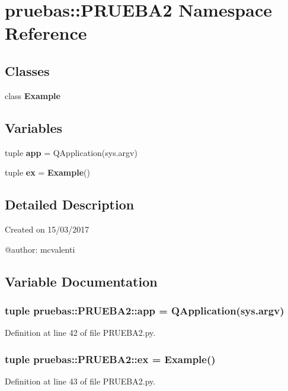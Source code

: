 \section{pruebas\-:\-:\-P\-R\-U\-E\-B\-A2 \-Namespace \-Reference}
\label{namespacepruebas_1_1_p_r_u_e_b_a2}
\subsection*{\-Classes}
\begin{DoxyCompactItemize}
\item 
class {\bf \-Example}
\end{DoxyCompactItemize}
\subsection*{\-Variables}
\begin{DoxyCompactItemize}
\item 
tuple {\bf app} = \-Q\-Application(sys.\-argv)
\item 
tuple {\bf ex} = {\bf \-Example}()
\end{DoxyCompactItemize}


\subsection{\-Detailed \-Description}
\begin{DoxyVerb}
Created on 15/03/2017

@author: mcvalenti
\end{DoxyVerb}
 

\subsection{\-Variable \-Documentation}
\subsubsection[{app}]{\setlength{\rightskip}{0pt plus 5cm}tuple {\bf pruebas\-::\-P\-R\-U\-E\-B\-A2\-::app} = \-Q\-Application(sys.\-argv)}\label{namespacepruebas_1_1_p_r_u_e_b_a2_a7f36568e220dfb1ed87a47fd7ee77a59}


\-Definition at line 42 of file \-P\-R\-U\-E\-B\-A2.\-py.

\subsubsection[{ex}]{\setlength{\rightskip}{0pt plus 5cm}tuple {\bf pruebas\-::\-P\-R\-U\-E\-B\-A2\-::ex} = {\bf \-Example}()}\label{namespacepruebas_1_1_p_r_u_e_b_a2_ad46cd7c6d018d819953bf6e86337c88b}


\-Definition at line 43 of file \-P\-R\-U\-E\-B\-A2.\-py.

